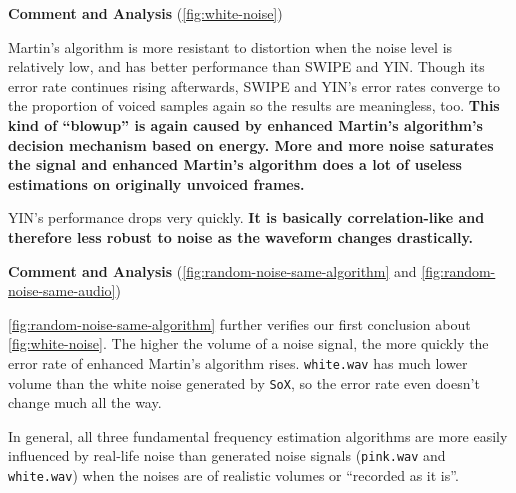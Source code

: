 \documentclass[11pt,a4paper]{report}
\begin{document}
\begin{mdframed}
\textbf{Comment and Analysis} (\autoref{fig:white-noise})

\bigskip

Martin's algorithm is more resistant to distortion when the noise level is relatively low, and has better performance than SWIPE and YIN\@.
Though its error rate continues rising afterwards, SWIPE and YIN's error rates converge to the proportion of voiced samples again so the results are meaningless, too.
\textbf{This kind of \enquote{blowup} is again caused by enhanced Martin's algorithm's decision mechanism based on energy.
More and more noise saturates the signal and enhanced Martin's algorithm does a lot of useless estimations on originally unvoiced frames.}

\bigskip

YIN's performance drops very quickly.
\textbf{It is basically correlation-like and therefore less robust to noise as the waveform changes drastically.}
\end{mdframed}

\begin{mdframed}
\textbf{Comment and Analysis} (\autoref{fig:random-noise-same-algorithm} and \autoref{fig:random-noise-same-audio})

\bigskip

\autoref{fig:random-noise-same-algorithm} further verifies our first conclusion about \autoref{fig:white-noise}.
The higher the volume of a noise signal, the more quickly the error rate of enhanced Martin's algorithm rises.
\texttt{white.wav} has much lower volume than the white noise generated by \texttt{SoX}, so the error rate even doesn't change much all the way.

\bigskip

In general, all three fundamental frequency estimation algorithms are more easily influenced by real-life noise than generated noise signals (\texttt{pink.wav} and \texttt{white.wav}) when the noises are of realistic volumes or \enquote{recorded as it is}.

\end{mdframed}
\end{document}
